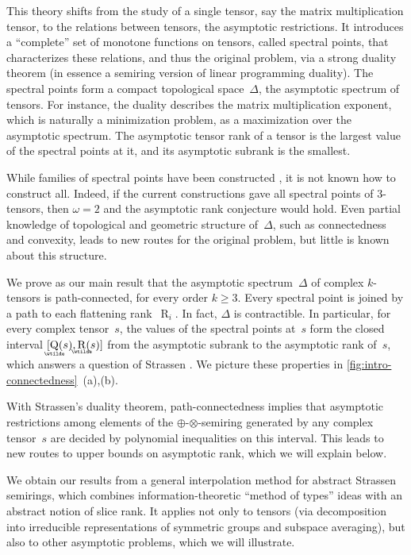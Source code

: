\documentclass[11pt,letterpaper]{article}
\DeclareMathOperator{\asympsubrank}{\underaccent{\wtilde}{Q}}
\DeclareMathOperator{\asymprank}{\underaccent{\wtilde}{R}}
\DeclareMathOperator{\tensorrank}{R}
\begin{document}
This theory shifts from the study of a single tensor, say the matrix multiplication tensor, to the relations between tensors, the asymptotic restrictions. It introduces a ``complete'' set of monotone functions on tensors, called spectral points, that characterizes these relations, and thus the original problem, via a strong duality theorem (in essence a semiring version of linear programming duality). The spectral points form a compact topological space~$\Delta$, the asymptotic spectrum of tensors. For instance, the duality describes the matrix multiplication exponent, which is naturally a minimization problem, as a maximization over the asymptotic spectrum. The asymptotic tensor rank of a tensor is the largest value of the spectral points at it, and its asymptotic subrank is the smallest. 

While families of spectral points have been constructed  \cite{strassen1991degeneration,MR4495838,botero2026quantumfunctionalshigherordertensors,sakabe2026strassenssupportfunctionalscoincide,alman2026edgeasymptoticspectrumtensors}, it is not known how to construct all. Indeed, if the current constructions gave all spectral points of 3-tensors, then \(\omega=2\) and the asymptotic rank conjecture would hold. Even partial knowledge of topological and geometric structure of~$\Delta$, such as connectedness and convexity, leads to new routes for the original problem, but little is known about this structure.

We prove as our main result that the asymptotic spectrum~\(\Delta\) of complex $k$-tensors is path-connected, for every order \(k\geq3\). Every spectral point is joined by a path to each flattening rank~\(\tensorrank_i\). In fact, \(\Delta\) is contractible. In particular, for every complex tensor~\(s\), the values of the spectral points at~\(s\) form the closed interval $
[\asympsubrank(s),\asymprank(s)]$
from the asymptotic subrank to the asymptotic rank of~\(s\), which answers a question of Strassen \cite{DBLP:conf/issac/Strassen12}. We picture these properties in \cref{fig:intro-connectedness}~(a),(b). 

With Strassen's duality theorem, path-connectedness implies that asymptotic restrictions among elements of the $\oplus$-$\otimes$-semiring generated by any complex tensor~$s$ are decided by polynomial inequalities on this interval. This leads to new routes to upper bounds on asymptotic rank, which we will explain below.  

We obtain our results from a general interpolation method for abstract Strassen semirings, which combines information-theoretic ``method of types'' ideas with an abstract notion of slice rank. It applies not only to tensors (via decomposition into irreducible representations of symmetric groups and subspace averaging), but also to other asymptotic problems, which we will illustrate. 
\end{document}
